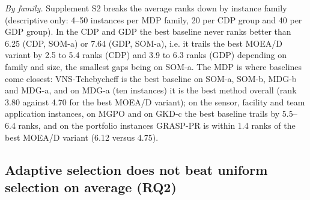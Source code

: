 \emph{By family.} Supplement S2 breaks the average ranks down by instance family (descriptive only: 4--50 instances per MDP family, 20 per CDP group and 40 per GDP group). In the CDP and GDP the best baseline never ranks better than 6.25 (CDP, SOM-a) or 7.64 (GDP, SOM-a), i.e. it trails the best MOEA/D variant by 2.5 to 5.4 ranks (CDP) and 3.9 to 6.3 ranks (GDP) depending on family and size, the smallest gaps being on SOM-a. The MDP is where baselines come closest: VNS-Tchebycheff is the best baseline on SOM-a, SOM-b, MDG-b and MDG-a, and on MDG-a (ten instances) it is the best method overall (rank 3.80 against 4.70 for the best MOEA/D variant); on the sensor, facility and team application instances, on MGPO and on GKD-c the best baseline trails by 5.5--6.4 ranks, and on the portfolio instances GRASP-PR is within 1.4 ranks of the best MOEA/D variant (6.12 versus 4.75).

\subsection{Adaptive selection does not beat uniform selection on average (RQ2)}\label{sec:adaptive_selection_does_not_}

\begin{table}[t]
\centering
\small
\setlength{\tabcolsep}{4pt}
\caption{Each adaptive-selection variant against uniform operator selection (paired over instances; Wilcoxon--Holm over the six comparisons; $\hat{A}_{12}$ = P(variant better than uniform))}\label{tab:4}
\end{table}

